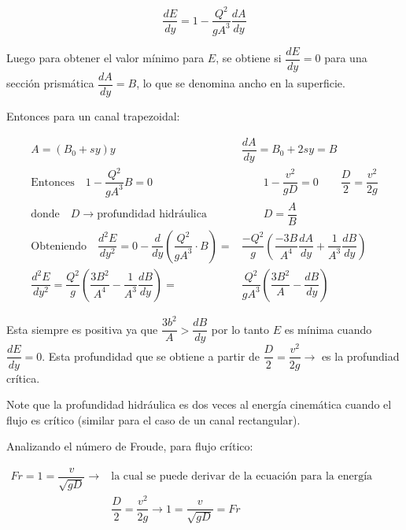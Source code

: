 \documentclass[a4paper, 11pt]{article}
\begin{document}
\begin{equation}
    \dfrac{dE}{dy}=1-\dfrac{Q^{2}}{gA^{3}}\dfrac{dA}{dy}
\end{equation}

Luego para obtener el valor mínimo para $E$, se obtiene si $\dfrac{dE}{dy}=0$ para una sección prismática $\dfrac{dA}{dy}=B$, lo que se denomina ancho en la superficie.

Entonces para un canal trapezoidal:

\begin{equation}
    \begin{aligned}  
        A=(B_0+sy)y \qquad &\dfrac{dA}{dy}=B_0+2sy=B\\
        \text{Entonces} \quad 1-\dfrac{Q^{2}}{gA^{3}}B=0& \qquad 1-\dfrac{v^{2}}{gD}=0 \qquad \dfrac{D}{2}=\dfrac{v^{2}}{2g}\\
        \text{donde} \quad D\rightarrow \text{profundidad hidráulica}& \qquad D=\dfrac{A}{B}\\
        \text{Obteniendo} \quad \dfrac{d^{2}E}{dy^{2}}=0-\dfrac{d}{dy}\left(\dfrac{Q^{2}}{gA^{3}}\cdot B\right)=&\dfrac{-Q^{2}}{g}\left(\dfrac{-3B}{A^{4}}\dfrac{dA}{dy}+\dfrac{1}{A^{3}}\dfrac{dB}{dy}\right)\\
        \dfrac{d^{2}E}{dy^{2}}=\dfrac{Q^{2}}{g}\left(\dfrac{3B^{2}}{A^{4}}-\dfrac{1}{A^{3}}\dfrac{dB}{dy}\right)=&\dfrac{Q^{2}}{gA^{3}}\left(\dfrac{3B^{2}}{A}-\dfrac{dB}{dy}\right)
    \end{aligned}
\end{equation}

Esta siempre es positiva ya que $\dfrac{3b^{2}}{A}>\dfrac{dB}{dy}$ por lo tanto $E$ es mínima cuando $\dfrac{dE}{dy}=0$. Esta profundidad que se obtiene a partir de $\dfrac{D}{2}=\dfrac{v^{2}}{2g}\rightarrow$ es la profundiad crítica. \vspace{1ex}

Note que la profundidad hidráulica es dos veces al energía cinemática cuando el flujo es crítico (similar para el caso de un canal rectangular).

Analizando el número de Froude, para flujo crítico:

\begin{equation}
    \begin{aligned}
        Fr=1=\dfrac{v}{\sqrt{gD}} \rightarrow& \text{la cual se puede derivar de la ecuación para la energía mínima}\\ 
        &\dfrac{D}{2}=\dfrac{v^{2}}{2g} \rightarrow 1 = \dfrac{v}{\sqrt{gD}}=Fr
    \end{aligned} 
\end{equation}
\end{document}
